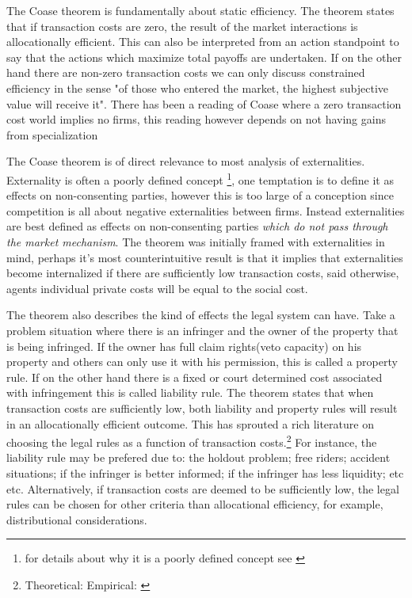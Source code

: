 \documentclass[12pt]{article}
\numberwithin{equation}{section}
\begin{document}
The Coase theorem is fundamentally about static efficiency. The theorem states that if transaction costs are zero, the result of the market interactions is allocationally efficient. This can also be interpreted from an action standpoint to say that the actions which maximize total payoffs are undertaken. If on the other hand there are non-zero transaction costs we can only discuss constrained efficiency in the sense "of those who entered the market, the highest subjective value will receive it". There has been a reading of Coase where a zero transaction cost world implies no firms, this reading however depends on not having gains from specialization \cite{demsetz2011rh}

The Coase theorem is of direct relevance to most analysis of externalities. Externality is often a poorly defined concept \footnote{for details about why it is a poorly defined concept see \cite{Cheung1970}}, one temptation is to define it as effects on non-consenting parties, however this is too large of a conception since competition is all about negative externalities between firms. Instead externalities are best defined as effects on non-consenting parties \textit{which do not pass through the market mechanism}. The theorem was initially framed with externalities in mind, perhaps it's most counterintuitive result is that it implies that externalities become internalized if there are sufficiently low transaction costs, said otherwise, agents individual private costs will be equal to the social cost.

The theorem also describes the kind of effects the legal system can have. Take a problem situation where there is an infringer and the owner of the property that is being infringed. If the owner has full claim rights(veto capacity) on his property and others can only use it with his permission, this is called a property rule. If on the other hand there is a fixed or court determined cost associated with infringement this is called liability rule. The theorem states that when transaction costs are sufficiently low, both liability and property rules will result in an allocationally efficient outcome. This has sprouted a rich literature on choosing the legal rules as a function of transaction costs.\footnote{Theoretical: \cite{calabresi1972property} Empirical: \cite{kaplow1995property}} For instance, the liability rule may be prefered due to: the holdout problem; free riders; accident situations; if the infringer is better informed; if the infringer has less liquidity; etc etc. Alternatively, if transaction costs are deemed to be sufficiently low, the legal rules can be chosen for other criteria than allocational efficiency, for example, distributional considerations.
\end{document}

